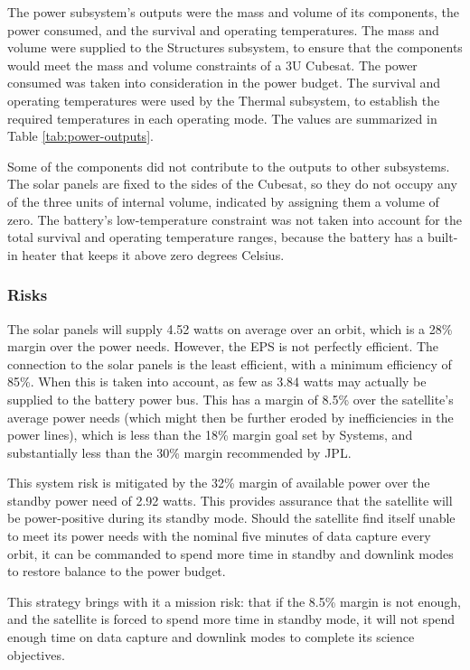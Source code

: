 \documentclass[12pt]{article}
\begin{document}
The power subsystem's outputs were the mass and volume of its components, the power consumed, and the survival and operating temperatures.  The mass and volume were supplied to the Structures subsystem, to ensure that the components would meet the mass and volume constraints of a 3U Cubesat.  The power consumed was taken into consideration in the power budget.  The survival and operating temperatures were used by the Thermal subsystem, to establish the required temperatures in each operating mode.  The values are summarized in Table \ref{tab:power-outputs}.

Some of the components did not contribute to the outputs to other subsystems.  The solar panels are fixed to the sides of the Cubesat, so they do not occupy any of the three units of internal volume, indicated by assigning them a volume of zero.  The battery's low-temperature constraint was not taken into account for the total survival and operating temperature ranges, because the battery has a built-in heater that keeps it above zero degrees Celsius.\cite[p.~12]{Battery-manual}

			\subsubsection{Risks}

The solar panels will supply 4.52 watts on average over an orbit, which is a 28\% margin over the power needs.  However, the EPS is not perfectly efficient.  The connection to the solar panels is the least efficient, with a minimum efficiency of 85\%\cite[p.~9]{EPS-manual}.  When this is taken into account, as few as 3.84 watts may actually be supplied to the battery power bus.  This has a margin of 8.5\% over the satellite's average power needs (which might then be further eroded by inefficiencies in the power lines), which is less than the 18\% margin goal set by Systems, and substantially less than the 30\% margin recommended by JPL.

This system risk is mitigated by the 32\% margin of available power over the standby power need of 2.92 watts.  This provides assurance that the satellite will be power-positive during its standby mode.  Should the satellite find itself unable to meet its power needs with the nominal five minutes of data capture every orbit, it can be commanded to spend more time in standby and downlink modes to restore balance to the power budget.

This strategy brings with it a mission risk: that if the 8.5\% margin is not enough, and the satellite is forced to spend more time in standby mode, it will not spend enough time on data capture and downlink modes to complete its science objectives.
\end{document}
